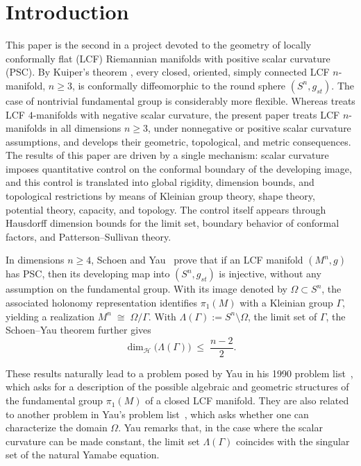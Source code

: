 \documentclass[12pt,oneside,a4paper]{article}
\theoremstyle{mytheorem}
\theoremstyle{remark}
\theoremstyle{definition}
\begin{document}
\section{Introduction}
This paper is the second in a project
\cite{2025arXiv251213528D} devoted to the geometry of
locally conformally flat (LCF) Riemannian manifolds with positive scalar
curvature (PSC).  By Kuiper's theorem \cite{zbMATH03061883}, every closed,
oriented, simply connected LCF \(n\)-manifold, \(n\ge 3\), is conformally
diffeomorphic to the round sphere \((S^n,g_{st})\).  The case of
nontrivial fundamental group is considerably more flexible.  Whereas
\cite{2025arXiv251213528D} treats LCF \(4\)-manifolds with negative scalar curvature, the present paper treats
LCF \(n\)-manifolds in all dimensions \(n\ge 3\), under nonnegative or positive
scalar curvature assumptions, and develops their geometric, topological, and
metric consequences.  The results of this paper are driven by a single
mechanism: scalar curvature imposes quantitative control on the conformal
boundary of the developing image, and this control is translated into global
rigidity, dimension bounds, and topological restrictions by means of Kleinian
group theory, shape theory, potential theory, capacity, and topology.  The
control itself appears through Hausdorff dimension bounds for the limit set,
boundary behavior of conformal factors, and Patterson--Sullivan theory.

In dimensions $n\ge 4$, Schoen and Yau~\cite{zbMATH04075988} prove
that if an LCF manifold $(M^n,g)$ has PSC, then its developing map into $(S^n,g_{st})$
is injective, without any assumption on the fundamental group.  With
its image denoted by $\Omega\subset S^n$, the associated holonomy representation
identifies $\pi_1(M)$ with a Kleinian group $\Gamma$, yielding a
realization $ M^n\;\cong\;\Omega/\Gamma.$
With $\Lambda(\Gamma):=S^n\setminus\Omega$, the limit set of
$\Gamma$, the Schoen--Yau theorem further gives
\begin{equation}\label{eq:SY-upper}
        \dim_{\mathcal H}\bigl(\Lambda(\Gamma)\bigr)\;\le\;\frac{n-2}{2}.
\end{equation}

These results naturally lead to a problem posed by Yau in his 1990
problem list~\cite[Problem~2]{MR1216573}, which asks for a description
of the possible algebraic and geometric structures of the fundamental
group $\pi_1(M)$ of a closed LCF manifold.  They are also related to
another problem in Yau's problem list~\cite[Problem~36]{MR1216573},
which asks whether one can characterize the domain $\Omega$.  Yau
remarks that, in the case where the scalar curvature can be made
constant, the limit set $\Lambda(\Gamma)$ coincides with the singular
set of the natural Yamabe equation.
\end{document}
